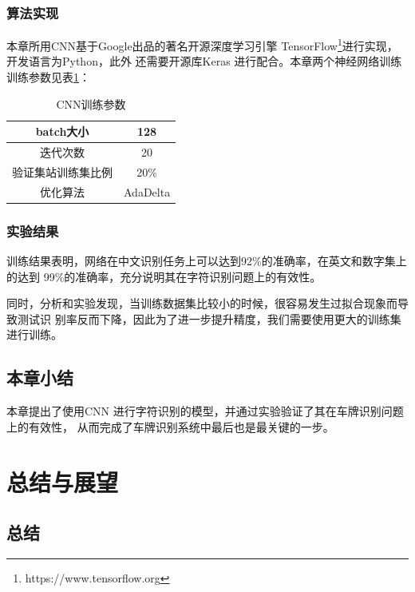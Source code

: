 \subsection{算法实现}

本章所用CNN基于Google出品的著名开源深度学习引擎
TensorFlow\footnote{https://www.tensorflow.org}进行实现，开发语言为Python，此外
还需要开源库Keras 进行配合。本章两个神经网络训练训练参数见表\ref{Tab:RecogCNNArgs}：

\begin{table}[ht]
\centering
\caption{CNN训练参数}\label{Tab:RecogCNNArgs}
\begin{tabular}{|c|c|}
\hline
  batch大小 & 128 \\
\hline
  迭代次数 & 20 \\
\hline
  验证集站训练集比例 & 20\% \\
\hline
  优化算法 & AdaDelta\cite{Zeiler:2012uw} \\
\hline
\end{tabular}
\end{table}

\subsection{实验结果}

训练结果表明，网络在中文识别任务上可以达到92\%的准确率，在英文和数字集上的达到
99\%的准确率，充分说明其在字符识别问题上的有效性。

同时，分析和实验发现，当训练数据集比较小的时候，很容易发生过拟合现象而导致测试识
别率反而下降，因此为了进一步提升精度，我们需要使用更大的训练集进行训练。

\section{本章小结}

本章提出了使用CNN 进行字符识别的模型，并通过实验验证了其在车牌识别问题上的有效性，
从而完成了车牌识别系统中最后也是最关键的一步。

\chapter{总结与展望}

\section{总结}

